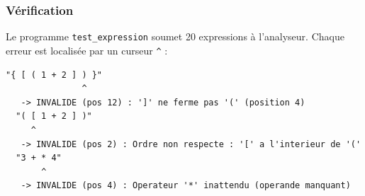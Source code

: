 \documentclass[11pt,a4paper]{article}
\newcommand{\code}[1]{\texttt{#1}}
\begin{document}
\subsubsection{Vérification}

Le programme \code{test\_expression} soumet 20 expressions à l'analyseur.
Chaque erreur est localisée par un curseur \code{\textasciicircum} :

\begin{lstlisting}[style=sortie, caption={Extrait de la sortie de \code{test\_expression}}]
  "{ [ ( 1 + 2 ] ) }"
               ^
   -> INVALIDE (pos 12) : ']' ne ferme pas '(' (position 4)
  "( [ 1 + 2 ] )"
     ^
   -> INVALIDE (pos 2) : Ordre non respecte : '[' a l'interieur de '('
  "3 + * 4"
       ^
   -> INVALIDE (pos 4) : Operateur '*' inattendu (operande manquant)
\end{lstlisting}
\end{document}
